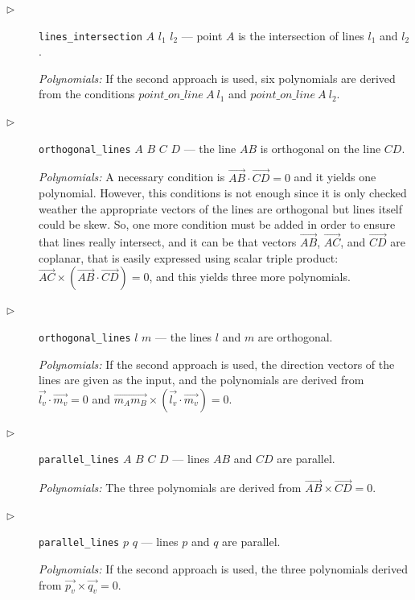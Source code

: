 \documentclass[final,1p,times,authoryear]{elsarticle}
\begin{document}
\begin{description}
\item[$\triangleright$] {\tt lines\_intersection} $A$ $l_1$ $l_2$
  --- point $A$ is the intersection of lines $l_1$ and $l_2$.

  {\em Polynomials:} If the second approach is used, six polynomials
  are derived from the conditions $point\_on\_line\ A\ l_1$ and
  $point\_on\_line\ A\ l_2$.

\item[$\triangleright$] {\tt orthogonal\_lines} $A$ $B$ $C$ $D$ ---
  the line $AB$ is orthogonal on the line $CD$.

  {\em Polynomials:} A necessary condition is
  $\overrightarrow{AB} \cdot \overrightarrow{CD} = 0$ and it yields
  one polynomial. However, this conditions is not enough since it is
  only checked weather the appropriate vectors of the lines are
  orthogonal but lines itself could be skew. So, one more condition
  must be added in order to ensure that lines really intersect, and it
  can be that vectors $\overrightarrow{AB}$, $\overrightarrow{AC}$,
  and $\overrightarrow{CD}$ are coplanar, that is easily expressed
  using scalar triple product:
  $\overrightarrow{AC} \times (\overrightarrow{AB} \cdot
  \overrightarrow{CD}) = 0$, and this yields three more polynomials.

\item[$\triangleright$] {\tt orthogonal\_lines} $l$ $m$ --- the lines
  $l$ and $m$ are orthogonal.

  {\em Polynomials:} If the second approach is used, the direction
  vectors of the lines are given as the input, and the polynomials are
  derived from $\overrightarrow{l_v} \cdot \overrightarrow{m_v} = 0$
  and
  $\overrightarrow{m_Am_B} \times (\overrightarrow{l_v} \cdot
  \overrightarrow{m_v}) = 0$.

\item[$\triangleright$] {\tt parallel\_lines} $A$ $B$ $C$ $D$ ---
  lines $AB$ and $CD$ are parallel.

  {\em Polynomials:} The three polynomials are derived from
  $\overrightarrow{AB} \times \overrightarrow{CD} = 0$.

\item[$\triangleright$] {\tt parallel\_lines} $p$ $q$ --- lines $p$
  and $q$ are parallel.

  {\em Polynomials:} If the second approach is used, the three
  polynomials derived from
  $\overrightarrow{p_v} \times \overrightarrow{q_v} = 0$.



\end{description}
\end{document}
